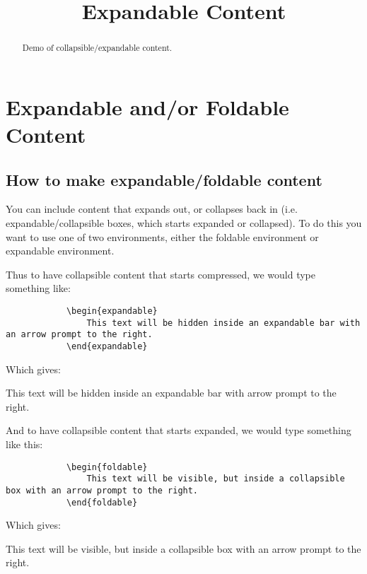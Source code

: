 \documentclass{ximera}
\title{Expandable Content}
\begin{document}
\begin{abstract}
    Demo of collapsible/expandable content.
\end{abstract}
\maketitle
\section*{Expandable and/or Foldable Content}
    \subsection*{How to make expandable/foldable content}
        You can include content that expands out, or collapses back in (i.e. expandable/collapsible boxes, which starts expanded or collapsed). To do this you want to use one of two environments, either the foldable environment or expandable environment.
        
        Thus to have collapsible content that starts compressed, we would type something like:
        \begin{verbatim}
            \begin{expandable}
                This text will be hidden inside an expandable bar with an arrow prompt to the right.
            \end{expandable}
        \end{verbatim}
        
        Which gives:
    
        \begin{expandable}
            This text will be hidden inside an expandable bar with arrow prompt to the right.
        \end{expandable}
            
        And to have collapsible content that starts expanded, we would type something like this:
    
        \begin{verbatim}
            \begin{foldable}
                This text will be visible, but inside a collapsible box with an arrow prompt to the right.
            \end{foldable}
        \end{verbatim}
    
        Which gives:
    
        \begin{foldable}
            This text will be visible, but inside a collapsible box with an arrow prompt to the right.
        \end{foldable}
    
\end{document}
